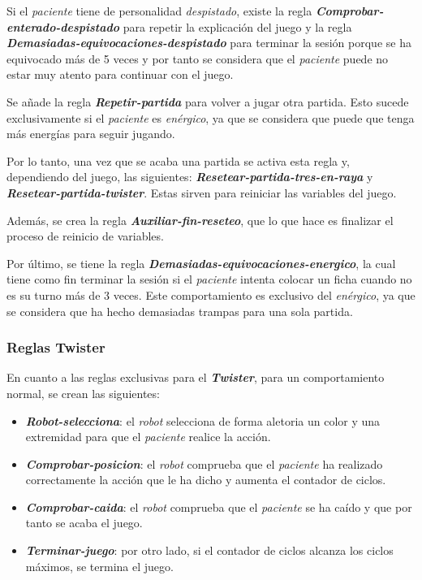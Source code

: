 \documentclass{uc3mpracticas}
\begin{document}
  Si el \textit{paciente} tiene de personalidad \textit{despistado}, existe la regla \textbf{\textit{Comprobar-enterado-despistado}} para repetir la explicación del juego y la regla \textbf{\textit{Demasiadas-equivocaciones-despistado}} para terminar la sesión porque se ha equivocado más de 5 veces y por tanto se considera que el \textit{paciente} puede no estar muy atento para continuar con el juego.

  \vspace{3mm}

  Se añade la regla \textbf{\textit{Repetir-partida}} para volver a jugar otra partida. Esto sucede exclusivamente si el \textit{paciente} es \textit{enérgico}, ya que se considera que puede que tenga más energías para seguir jugando.

  \vspace{1mm}

  Por lo tanto, una vez que se acaba una partida se activa esta regla y, dependiendo del juego, las siguientes: \textbf{\textit{Resetear-partida-tres-en-raya}} y \textbf{\textit{Resetear-partida-twister}}. Estas sirven para reiniciar las variables del juego.

  \vspace{2mm}

  Además, se crea la regla \textbf{\textit{Auxiliar-fin-reseteo}}, que lo que hace es finalizar el proceso de reinicio de variables.

  \vspace{2mm}

  Por último, se tiene la regla \textbf{\textit{Demasiadas-equivocaciones-energico}}, la cual tiene como fin terminar la sesión si el \textit{paciente} intenta colocar un ficha cuando no es su turno más de 3 veces. Este comportamiento es exclusivo del \textit{enérgico}, ya que se considera que ha hecho demasiadas trampas para una sola partida.




  \subsubsection{Reglas Twister}

  En cuanto a las reglas exclusivas para el \textit{\textbf{Twister}}, para un comportamiento normal, se crean las siguientes:

  \begin{itemize}
    \item \textbf{\textit{Robot-selecciona}}: el \textit{robot} selecciona de forma aletoria un color y una extremidad para que el \textit{paciente} realice la acción.
    \item \textbf{\textit{Comprobar-posicion}}: el \textit{robot} comprueba que el \textit{paciente} ha realizado correctamente la acción que le ha dicho y aumenta el contador de ciclos.
    \item \textbf{\textit{Comprobar-caida}}: el \textit{robot} comprueba que el \textit{paciente} se ha caído y que por tanto se acaba el juego.
    \item \textbf{\textit{Terminar-juego}}: por otro lado, si el contador de ciclos alcanza los ciclos máximos, se termina el juego.
  \end{itemize}
\end{document}
